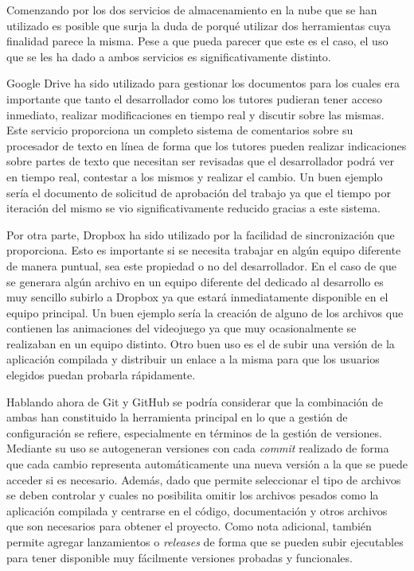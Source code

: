 Comenzando por los dos servicios de almacenamiento en la nube que se han utilizado es posible que surja la duda de porqué utilizar dos herramientas cuya finalidad parece la misma. Pese a que pueda parecer que este es el caso, el uso que se les ha dado a ambos servicios es significativamente distinto.

\bigskip

Google Drive ha sido utilizado para gestionar los documentos para los cuales era importante que tanto el desarrollador como los tutores pudieran tener acceso inmediato, realizar modificaciones en tiempo real y discutir sobre las mismas. Este servicio proporciona un completo sistema de comentarios sobre su procesador de texto en línea de forma que los tutores pueden realizar indicaciones sobre partes de texto que necesitan ser revisadas que el desarrollador podrá ver en tiempo real, contestar a los mismos y realizar el cambio. Un buen ejemplo sería el documento de solicitud de aprobación del trabajo ya que el tiempo por iteración del mismo se vio significativamente reducido gracias a este sistema.

\bigskip

Por otra parte, Dropbox ha sido utilizado por la facilidad de sincronización que proporciona. Esto es importante si se necesita trabajar en algún equipo diferente de manera puntual, sea este propiedad o no del desarrollador. En el caso de que se generara algún archivo en un equipo diferente del dedicado al desarrollo es muy sencillo subirlo a Dropbox ya que estará inmediatamente disponible en el equipo principal. Un buen ejemplo sería la creación de alguno de los archivos que contienen las animaciones del videojuego ya que muy ocasionalmente se realizaban en un equipo distinto. Otro buen uso es el de subir una versión de la aplicación compilada y distribuir un enlace a la misma para que los usuarios elegidos puedan probarla rápidamente.

\bigskip

Hablando ahora de Git y GitHub se podría considerar que la combinación de ambas han constituido la herramienta principal en lo que a gestión de configuración se refiere, especialmente en términos de la gestión de versiones. Mediante su uso se autogeneran versiones con cada \textit{commit} realizado de forma que cada cambio representa automáticamente una nueva versión a la que se puede acceder si es necesario. Además, dado que permite seleccionar el tipo de archivos se deben controlar y cuales no posibilita omitir los archivos pesados como la aplicación compilada y centrarse en el código, documentación y otros archivos que son necesarios para obtener el proyecto. Como nota adicional, también permite agregar lanzamientos o \textit{releases} de forma que se pueden subir ejecutables para tener disponible muy fácilmente versiones probadas y funcionales.

